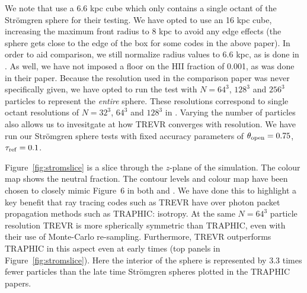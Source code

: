 \documentclass[fleq,usenatbib]{mnras}
\newcommand{\acro}{TREVR}
\newcommand{\tO}{\theta_{\rm open}}
\newcommand{\strom}{Str\"omgren}
\begin{document}
{We note that \cite{ilievEt06} use a 6.6 kpc cube which only contains a single
octant of the \strom{} sphere for their testing. We have opted to use an 16 
kpc cube, increasing the maximum front radius to 8 kpc to avoid any edge 
effects (the sphere gets close to the edge of the box for some codes in 
the above paper). In order to aid comparison, we still normalize radius values 
to 6.6 kpc, as is done in \cite{ilievEt06}. As well, we have not imposed a 
floor on the HII fraction of 0.001, as was done in their paper. Because the 
resolution used in the \cite{ilievEt06} comparison paper was never 
specifically given, we have opted to run the test with $N = 64^3$, $128^3$ and 
$256^3$ particles to represent the \textit{entire} sphere. These resolutions 
correspond to single octant resolutions of $N=32^3$, $64^3$ and $128^3$ in 
\cite{ilievEt06}. Varying the number of particles also allows us to invesitgate
at how \acro{} converges with resolution. We have run our \strom{} sphere 
tests with fixed accuracy parameters of $\tO = 0.75$, 
$\tau_{\rm ref} = 0.1$.

Figure~\ref{fig:stromslice} is a slice through the $z$-plane of the 
simulation. The colour map shows the neutral fraction. The contour 
levels and colour map have been chosen to closely mimic Figure~6 in both 
\cite{pawlikSchaye08} and \cite{pawlikSchaye11}. We have done this to 
highlight a key benefit that ray tracing codes such as \acro{} have over 
photon packet propagation methods such as TRAPHIC: isotropy. At the same 
$N=64^3$ particle resolution \acro{} is more spherically symmetric than 
TRAPHIC, even with their use of Monte-Carlo re-sampling. Furthermore, \acro{} 
outperforms TRAPHIC in this aspect even at early times (top panels in 
Figure~\ref{fig:stromslice}). Here the interior of the sphere is represented 
by 3.3 times fewer particles than the late time \strom{} spheres plotted in 
the TRAPHIC papers.

}
\end{document}
